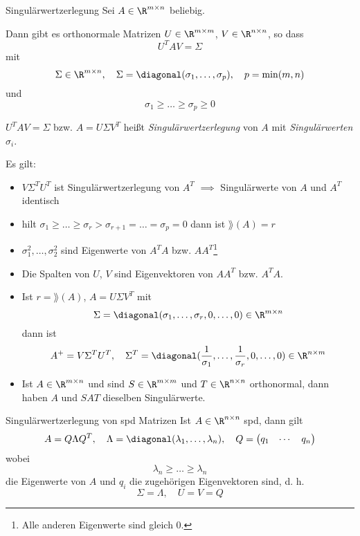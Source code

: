 \begin{defi}{Singulärwertzerlegung}
    Sei $A \in \R^{m \times n}$ beliebig.

    Dann gibt es orthonormale Matrizen $U \in \R^{m \times m}$, $V \in \R^{n \times n}$, so dass
    \[
        U^TAV = \Sigma
    \]
    mit
    \[
        \Sigma \in \R^{m \times n}, \quad \Sigma = \diagonal(\sigma_1, \ldots, \sigma_p), \quad p = \min(m , n)
    \]
    und
    \[
        \sigma_1 \geq \ldots \geq \sigma_p \geq 0
    \]

    $U^TAV = \Sigma$ bzw. $A = U\Sigma V^T$ heißt \emph{Singulärwertzerlegung} von $A$ mit \emph{Singulärwerten} $\sigma_i$.

    Es gilt:
    \begin{itemize}
        \item $V\Sigma^T U^T$ ist Singulärwertzerlegung von $A^T$ $\implies$ Singulärwerte von $A$ und $A^T$ identisch
        \item hilt $\sigma_1 \geq \ldots \geq \sigma_r > \sigma_{r+1} = \ldots = \sigma_p = 0$ dann ist $\rang(A) = r$
        \item $\sigma_1^2, \ldots, \sigma_2^2$ sind Eigenwerte von $A^TA$ bzw. $AA^T$\footnote{Alle anderen Eigenwerte sind gleich $0$.}
        \item Die Spalten von $U$, $V$ sind Eigenvektoren von $AA^T$ bzw. $A^TA$.
        \item Ist $r = \rang(A)$, $A = U \Sigma V^T$ mit
              \[
                  \Sigma = \diagonal(\sigma_1, \ldots, \sigma_r, 0, \ldots, 0) \in \R^{m \times n}
              \]
              dann ist
              \[
                  A^+ = V \Sigma^T U^T, \quad \Sigma^T = \diagonal(\frac{1}{\sigma_1}, \ldots, \frac{1}{\sigma_r}, 0, \ldots, 0) \in \R^{n \times m}
              \]
        \item Ist $A \in \R^{m \times n}$ und sind $S \in \R^{m \times m}$ und $T \in \R^{n \times n}$ orthonormal, dann haben $A$ und $SAT$ dieselben Singulärwerte.
    \end{itemize}
\end{defi}

\begin{bonus}{Singulärwertzerlegung von spd Matrizen}
    Ist $A \in \R^{n \times n}$ spd, dann gilt
    \[
        A = Q \Lambda Q^T, \quad \Lambda = \diagonal(\lambda_1, \ldots, \lambda_n), \quad Q = \begin{pmatrix} q_1 & \cdots & q_n \end{pmatrix}
    \]
    wobei
    \[
        \lambda_n \geq \ldots \geq \lambda_n
    \]
    die Eigenwerte von $A$ und $q_i$ die zugehörigen Eigenvektoren sind, d. h.
    \[
        \Sigma = \Lambda, \quad U = V = Q
    \]
\end{bonus}

